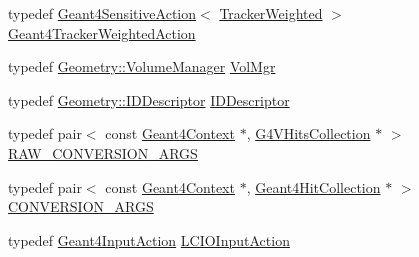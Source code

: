 \begin{DoxyCompactItemize}
\item 
typedef \hyperlink{class_d_d4hep_1_1_simulation_1_1_geant4_sensitive_action}{Geant4\+Sensitive\+Action}$<$ \hyperlink{struct_d_d4hep_1_1_simulation_1_1_tracker_weighted}{Tracker\+Weighted} $>$ \hyperlink{namespace_d_d4hep_1_1_simulation_a63833833f53787d1116da0c3bb635dc8}{Geant4\+Tracker\+Weighted\+Action}
\item 
typedef \hyperlink{class_d_d4hep_1_1_geometry_1_1_volume_manager}{Geometry\+::\+Volume\+Manager} \hyperlink{namespace_d_d4hep_1_1_simulation_a989cbf131f431a9856bcfd4ecd78c39f}{Vol\+Mgr}
\item 
typedef \hyperlink{class_d_d4hep_1_1_geometry_1_1_i_d_descriptor}{Geometry\+::\+I\+D\+Descriptor} \hyperlink{namespace_d_d4hep_1_1_simulation_a5f50c11f1a261ca45bb2e86ea6621083}{I\+D\+Descriptor}
\item 
typedef pair$<$ const \hyperlink{class_d_d4hep_1_1_simulation_1_1_geant4_context}{Geant4\+Context} $\ast$, \hyperlink{class_g4_v_hits_collection}{G4\+V\+Hits\+Collection} $\ast$ $>$ \hyperlink{namespace_d_d4hep_1_1_simulation_a9202b8807ca8dc9a21546a337d2fbc83}{R\+A\+W\+\_\+\+C\+O\+N\+V\+E\+R\+S\+I\+O\+N\+\_\+\+A\+R\+GS}
\item 
typedef pair$<$ const \hyperlink{class_d_d4hep_1_1_simulation_1_1_geant4_context}{Geant4\+Context} $\ast$, \hyperlink{class_d_d4hep_1_1_simulation_1_1_geant4_hit_collection}{Geant4\+Hit\+Collection} $\ast$ $>$ \hyperlink{namespace_d_d4hep_1_1_simulation_a8700b6db44e003d9cf53ec35933063dc}{C\+O\+N\+V\+E\+R\+S\+I\+O\+N\+\_\+\+A\+R\+GS}
\item 
typedef \hyperlink{class_d_d4hep_1_1_simulation_1_1_geant4_input_action}{Geant4\+Input\+Action} \hyperlink{namespace_d_d4hep_1_1_simulation_a1e6fc5fffc58682e1f7cfb8baa1f0987}{L\+C\+I\+O\+Input\+Action}
\end{DoxyCompactItemize}
